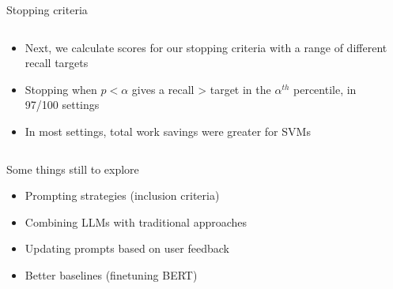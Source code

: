 \documentclass[9pt,aspectratio=169]{beamer}
\begin{document}
\begin{frame}{Stopping criteria}
	\begin{columns}
		\begin{column}{0.32\linewidth}
			\begin{itemize}
				\item<1->Next, we calculate scores for our stopping criteria with a range of different recall targets
				\item<2->Stopping when $p<\alpha$ gives a recall > target in the $\alpha^{th}$ percentile, in 97/100 settings
				\item<3->In most settings, total work savings were greater for SVMs 
			\end{itemize}
		\end{column}
		\begin{column}{0.68\linewidth}
			\only<2>{
			\begin{table}
				\scriptsize
				

			\end{table}
		}
		\end{column}
	\end{columns}
\end{frame}


\begin{frame}{Some things still to explore}
	
\begin{itemize}
	\item<1-> Prompting strategies (inclusion criteria)
	\item<2-> Combining LLMs with traditional approaches
	\item<3-> Updating prompts based on user feedback
	\item<4-> Better baselines (finetuning BERT)
\end{itemize}


\end{frame}
\end{document}
